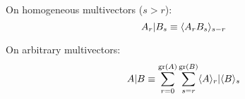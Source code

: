\begin{definition}
	On homogeneous multivectors ($s>r$):
	\[A_r | B_s \equiv \langle A_rB_s \rangle_{s-r}\]
	
	On arbitrary multivectors:
	\[A | B \equiv \sum_{r=0}^{\mathrm{gr}\left(A\right)}\sum_{s=r}^{\mathrm{gr}\left(B\right)} \langle A \rangle_{r} | \langle B \rangle_{s}\]
\end{definition}
